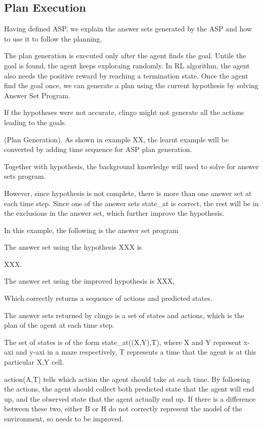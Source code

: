 \subsection{Plan Execution}
\label{subsec:plan_execution}
Having defined ASP, we explain the answer sets generated by the ASP and how to use it to follow the planning.

The plan generation is executed only after the agent finds the goal. Untile the goal is found, the agent keeps exploraing randomly.
In RL algorithm, the agent also needs the positive reward by reaching a termination state. 
Once the agent find the goal once, we can generate a plan using the current hypothesis by solving Answer Set Program.

If the hypotheses were not accurate, clingo might not generate all the actions leading to the goals.

\begin{examp} \normalfont (Plan Generation).
As shown in example XX, the learnt example will be converted by adding time sequence for ASP plan generation.

Together with hypothesis, the background knowledge will used to solve for answer sets program. 

However, since hypothesis is not complete, there is more than one answer set at each time step. Since one of the answer sets state\_at is correct, the rest will be in the exclusions in the answer set, 
which further improve the hypothesis.

In this example, the following is the answer set program

The answer set using the hypothesis XXX is 

XXX. 

The answer set using the improved hypothesis is XXX, 

Which correctly returns a sequence of actions and predicted states. 

\end{examp}


The answer sets returned by clingo is a set of states and actions, which is the plan of the agent at each time step.

The set of states is of the form state\_at((X,Y),T), where X and Y represent x-axi and y-axi in a maze respectively, T represents a time that the agent is at
this particular X,Y cell.

action(A,T) tells which action the agent should take at each time. By following the actions, the agent should collect both predicted state that the
agent will end up, and the observed state that the agent actually end up. If there is a difference between these two, either B or H do not correctly represent
the model of the environment, so needs to be improved.

